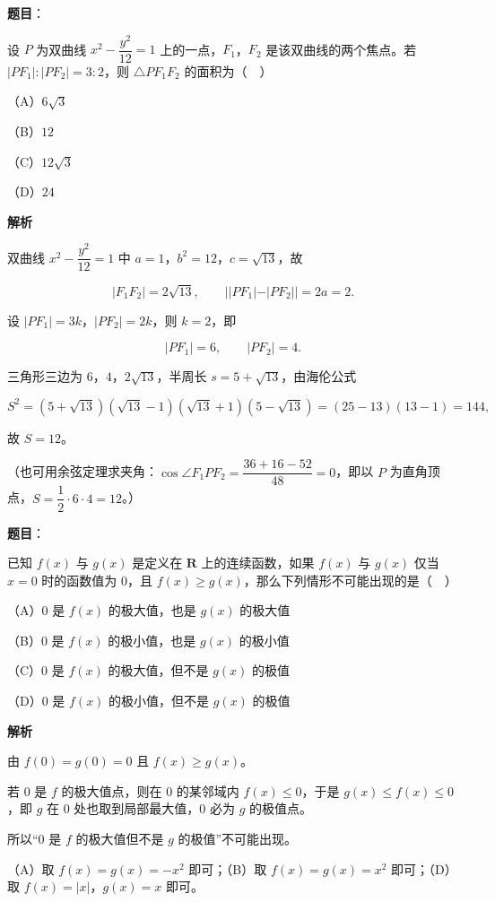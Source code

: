 \begin{answer}

\textbf{题目}：

设 $P$ 为双曲线 $x^2-\dfrac{y^2}{12}=1$ 上的一点，$F_1$，$F_2$ 是该双曲线的两个焦点。若 $|PF_1|:|PF_2|=3:2$，则 $\triangle PF_1F_2$ 的面积为（　）

（A）$6\sqrt3$

（B）$12$

（C）$12\sqrt3$

（D）$24$

\textbf{解析}

双曲线 $x^2-\dfrac{y^2}{12}=1$ 中 $a=1$，$b^2=12$，$c=\sqrt{13}$，故

\nopagebreak[4]
\[|F_1F_2|=2\sqrt{13},\qquad ||PF_1|-|PF_2||=2a=2.\]

设 $|PF_1|=3k$，$|PF_2|=2k$，则 $k=2$，即

\nopagebreak[4]
\[|PF_1|=6,\qquad |PF_2|=4.\]

三角形三边为 $6$，$4$，$2\sqrt{13}$，半周长 $s=5+\sqrt{13}$，由海伦公式

\nopagebreak[4]
\[S^2=(5+\sqrt{13})(\sqrt{13}-1)(\sqrt{13}+1)(5-\sqrt{13})=(25-13)(13-1)=144,\]

故 $S=12$。

（也可用余弦定理求夹角：$\cos\angle F_1PF_2=\dfrac{36+16-52}{48}=0$，即以 $P$ 为直角顶点，$S=\dfrac12\cdot6\cdot4=12$。）


\end{answer}
\begin{answer}

\textbf{题目}：

已知 $f(x)$ 与 $g(x)$ 是定义在 $\mathbf R$ 上的连续函数，如果 $f(x)$ 与 $g(x)$ 仅当 $x=0$ 时的函数值为 $0$，且 $f(x)\geqslant g(x)$，那么下列情形不可能出现的是（　）

（A）$0$ 是 $f(x)$ 的极大值，也是 $g(x)$ 的极大值

（B）$0$ 是 $f(x)$ 的极小值，也是 $g(x)$ 的极小值

（C）$0$ 是 $f(x)$ 的极大值，但不是 $g(x)$ 的极值

（D）$0$ 是 $f(x)$ 的极小值，但不是 $g(x)$ 的极值

\textbf{解析}

由 $f(0)=g(0)=0$ 且 $f(x)\geqslant g(x)$。

若 $0$ 是 $f$ 的极大值点，则在 $0$ 的某邻域内 $f(x)\leqslant0$，于是 $g(x)\leqslant f(x)\leqslant0$，即 $g$ 在 $0$ 处也取到局部最大值，$0$ 必为 $g$ 的极值点。

所以“$0$ 是 $f$ 的极大值但不是 $g$ 的极值”不可能出现。

（A）取 $f(x)=g(x)=-x^2$ 即可；（B）取 $f(x)=g(x)=x^2$ 即可；（D）取 $f(x)=|x|$，$g(x)=x$ 即可。


\end{answer}
